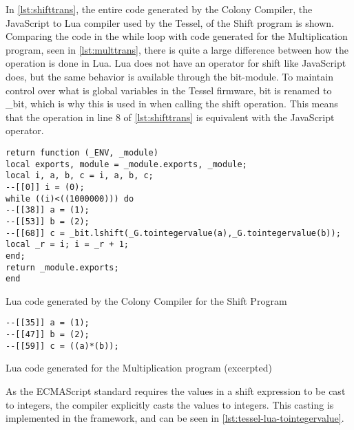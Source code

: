 In \cref{lst:shifttrans}, the entire code generated by the Colony Compiler, the JavaScript to Lua compiler used by the Tessel, of the Shift program is shown.
Comparing the code in the while loop with code generated for the Multiplication program, seen in \cref{lst:multtrans}, there is quite a large difference between how the operation is done in Lua.
Lua does not have an operator for shift like JavaScript does, but the same behavior is available through the bit-module.
To maintain control over what is global variables in the Tessel firmware, bit is renamed to \_bit, which is why this is used in when calling the shift operation.
This means that the operation in line 8 of \cref{lst:shifttrans} is equivalent with the JavaScript operator.

\begin{listing}[ht]
\begin{verbatim}
return function (_ENV, _module)
local exports, module = _module.exports, _module;
local i, a, b, c = i, a, b, c;
--[[0]] i = (0); 
while ((i)<((1000000))) do 
--[[38]] a = (1); 
--[[53]] b = (2); 
--[[68]] c = _bit.lshift(_G.tointegervalue(a),_G.tointegervalue(b)); 
local _r = i; i = _r + 1;
end;
return _module.exports;
end 
\end{verbatim}
\caption{Lua code generated by the Colony Compiler for the Shift Program}
\label{lst:shifttrans}
\end{listing}

\begin{listing}[ht]
\centering
\begin{verbatim}
--[[35]] a = (1); 
--[[47]] b = (2); 
--[[59]] c = ((a)*(b)); 
\end{verbatim}
\caption{Lua code generated for the Multiplication program (excerpted)}
\label{lst:multtrans}
\end{listing}

As the ECMAScript standard requires the values in a shift expression to be cast to integers, the compiler explicitly casts the values to integers. \citep[section 11.7.1]{ecmascript5}
This casting is implemented in the framework, and can be seen in \cref{lst:tessel-lua-tointegervalue}.

